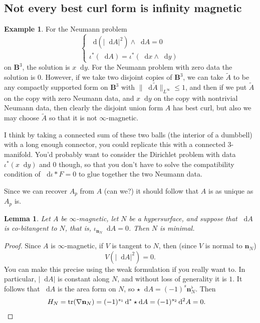 \documentclass[reqno,11pt]{amsart}
\newcommand{\Ball}{\mathbf{B}}
\newcommand*\dif{\mathop{}\!\mathrm{d}}
\DeclareMathOperator{\tr}{tr}
\newcommand{\normal}{\mathbf n}
\newtheorem{lemma}[theorem]{Lemma}
\theoremstyle{definition}
\newtheorem{example}[theorem]{Example}
\numberwithin{equation}{section}
\begin{document}
\subsection{Not every best curl form is infinity magnetic}
\begin{example}
For the Neumann problem 
$$\begin{cases}
\dif(|\dif A|^2) \wedge \dif A = 0 \\
\iota^*(\dif A) = \iota^*(\dif x \wedge \dif y)
\end{cases}$$
on $\Ball^3$, the solution is $x \dif y$. For the Neumann problem with zero data the solution is $0$.
However, if we take two disjoint copies of $\Ball^3$, we can take $\tilde A$ to be any compactly supported form on $\Ball^3$ with $\|\dif \tilde A\|_{L^\infty} \leq 1$, and then if we put $\tilde A$ on the copy with zero Neumann data, and $x \dif y$ on the copy with nontrivial Neumann data, then clearly the disjoint union form $A$ has best curl, but also we may choose $\tilde A$ so that it is not $\infty$-magnetic.

I think by taking a connected sum of these two balls (the interior of a dumbbell) with a long enough connector, you could replicate this with a connected $3$-manifold.
You'd probably want to consider the Dirichlet problem with data $\iota^*(x \dif y)$ and $0$ though, so that you don't have to solve the compatibility condition of $\dif \iota* F = 0$ to glue together the two Neumann data.
\end{example}



Since we can recover $A_p$ from $A$ (can we?) it should follow that $A$ is as unique as $A_p$ is.

\begin{lemma}
Let $A$ be $\infty$-magnetic, let $N$ be a hypersurface, and suppose that $\dif A$ is co-bitangent to $N$, that is, $\iota_{\normal_N} \dif A = 0$.
Then $N$ is minimal.
\end{lemma}
\begin{proof}
Since $A$ is $\infty$-magnetic, if $V$ is tangent to $N$, then (since $V$ is normal to $\normal_N$)
$$V(|\dif A|^2) = 0.$$
You can make this precise using the weak formulation if you really want to.
In particular, $|\dif A|$ is constant along $N$, and without loss of generality it is $1$.
It follows that $\dif A$ is the area form on $N$, so $\star \dif A = (-1)^s \normal_N^\flat$.
Then 
\begin{align*}
H_N &= \tr(\nabla \normal_N) = (-1)^{s_1} \dif^* \star \dif A = (-1)^{s_2} \dif^2 A = 0. \qedhere
\end{align*}
\end{proof}
\end{document}
